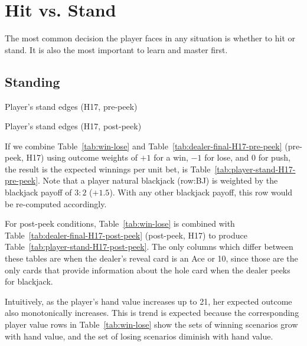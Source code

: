 \section{Hit vs. Stand}
\label{sec:basic:hit-stand}

The most common decision the player faces in any situation
is whether to hit or stand.
It is also the most important to learn and master first.

\subsection{Standing}
\label{sec:basic:hit-stand:stand}

\begin{table}[ht!]
\caption{Player's stand edges (H17, pre-peek)}
\begin{center}

\end{center}
\label{tab:player-stand-H17-pre-peek}
\end{table}

\begin{table}[ht!]
\caption{Player's stand edges (H17, post-peek)}
\begin{center}

\end{center}
\label{tab:player-stand-H17-post-peek}
\end{table}

If we combine Table~\ref{tab:win-lose} and
Table~\ref{tab:dealer-final-H17-pre-peek} (pre-peek, H17) 
using outcome weights of $+1$ for a win, $-1$ for lose, and $0$ for push, 
the result is the expected winnings per unit bet, 
is Table~\ref{tab:player-stand-H17-pre-peek}.
Note that a player natural blackjack (row:BJ) is weighted by the 
blackjack payoff of $3:2$ ($+1.5$).
With any other blackjack payoff, this row would be re-computed accordingly.

For post-peek conditions, Table~\ref{tab:win-lose} is combined with
Table~\ref{tab:dealer-final-H17-post-peek} (post-peek, H17) to produce
Table~\ref{tab:player-stand-H17-post-peek}.
The only columns which differ between these tables are when
the dealer's reveal card is an Ace or 10, since those are the only cards
that provide information about the hole card
when the dealer peeks for blackjack.

Intuitively, as the player's hand value increases up to 21, 
her expected outcome also monotonically increases.
This is trend is expected because the corresponding player value rows in
Table~\ref{tab:win-lose} show the sets of winning scenarios
grow with hand value, and the set of losing scenarios diminish with
hand value.  

